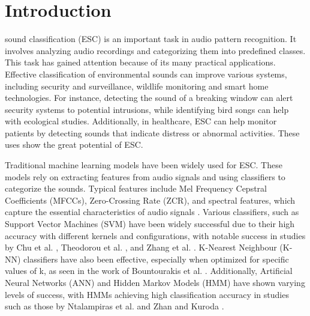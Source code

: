 \documentclass[journal]{IEEEtran}
\begin{document}
\section{Introduction}
% 
% 
% 
% 
 sound classification (ESC) is an important task in audio pattern recognition. It involves analyzing audio recordings and categorizing them into predefined classes. This task has gained attention because of its many practical applications. Effective classification of environmental sounds can improve various systems, including security and surveillance, wildlife monitoring and smart home technologies. For instance, detecting the sound of a breaking window can alert security systems to potential intrusions, while identifying bird songs can help with ecological studies. Additionally, in healthcare, ESC can help monitor patients by detecting sounds that indicate distress or abnormal activities. These uses show the great potential of ESC.

Traditional machine learning models have been widely used for ESC. These models rely on extracting features from audio signals and using classifiers to categorize the sounds. Typical features include Mel Frequency Cepstral Coefficients (MFCCs), Zero-Crossing Rate (ZCR), and spectral features, which capture the essential characteristics of audio signals \cite{BANSAL2022200115}.
Various classifiers, such as Support Vector Machines (SVM) have been widely successful due to their high accuracy with different kernels and configurations, with notable success in studies by Chu et al. \cite{chu}, Theodorou et al. \cite{theodorus}, and Zhang et al. \cite{zhang}. K-Nearest Neighbour (K-NN) classifiers have also been effective, especially when optimized for specific values of k, as seen in the work of Bountourakis et al. \cite{Bountourakis}. Additionally, Artificial Neural Networks (ANN) and Hidden Markov Models (HMM) have shown varying levels of success, with HMMs achieving high classification accuracy in studies such as those by Ntalampiras et al. \cite{Ntalampiras} and Zhan and Kuroda \cite{zhan}.
\end{document}

